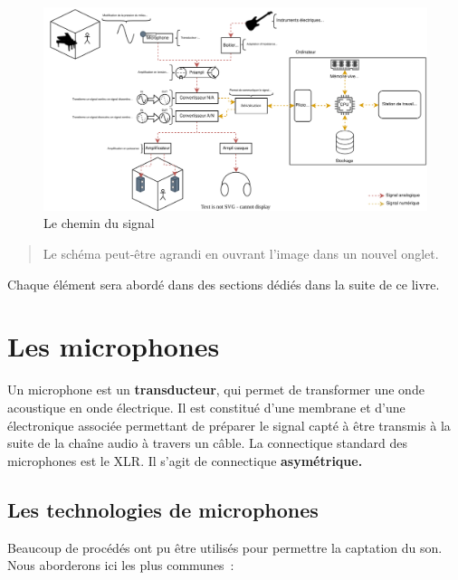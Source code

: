 \documentclass[
]{book}
\begin{document}
\begin{figure}

{\centering \includegraphics[width=1\linewidth]{_resources/diagrams/cheminSignal} 

}

\caption{Le chemin du signal}\label{fig:unnamed-chunk-15}
\end{figure}

\begin{quote}
Le schéma peut-être agrandi en ouvrant l'image dans un nouvel onglet.
\end{quote}

Chaque élément sera abordé dans des sections dédiés dans la suite de ce livre.

\hypertarget{les-microphones}{%
\chapter{Les microphones}\label{les-microphones}}

Un microphone est un \textbf{transducteur}, qui permet de transformer une onde acoustique en onde électrique. Il est constitué d'une membrane et d'une électronique associée permettant de préparer le signal capté à être transmis à la suite de la chaîne audio à travers un câble. La connectique standard des microphones est le XLR. Il s'agit de connectique \textbf{asymétrique.}

\hypertarget{les-technologies-de-microphones}{%
\section{Les technologies de microphones}\label{les-technologies-de-microphones}}

Beaucoup de procédés ont pu être utilisés pour permettre la captation du son. Nous aborderons ici les plus communes~:
\end{document}
